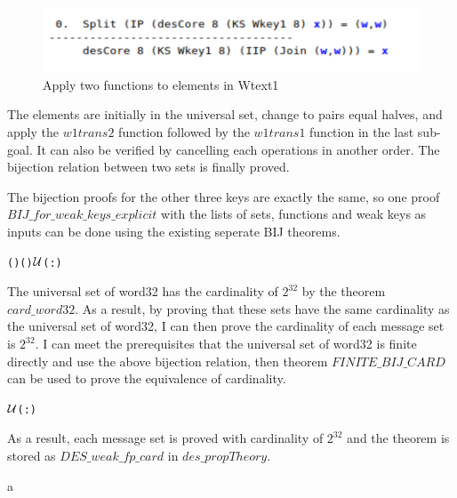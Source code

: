 \documentclass{article}
\begin{document}
\begin{figure}
\centering
\includegraphics[width=0.25\linewidth]{BIJ}
\caption{\label{fig:form5} Apply two functions to elements in Wtext1}
\end{figure}

The elements are initially in the universal set, change to pairs equal halves, and apply the $w1trans2$ function followed
by the $w1trans1$ function in the last sub-goal. It can also be verified by cancelling each operations in another order.
The bijection relation between two sets is finally proved.

The bijection proofs for the other three keys are exactly the same, so one proof $BIJ\_for\_weak\_keys\_explicit$ with the lists of sets, functions and
weak keys as inputs can be done using the existing seperate BIJ theorems.

\begin{alltt}
   \HOLTokenTurnstile{}  \HOLSymConst{\HOLTokenLt{}}  \HOLSymConst{\HOLTokenImp{}}  (  ) (  ) \ensuremath{{\cal{U}}}(:)
\end{alltt}

The universal set of word32 has the cardinality of $2^{32}$ by the theorem $card\_word32$. As a result, by proving that
these sets have the same cardinality as the universal set of word32, I can then prove the cardinality of each message set
is $2^{32}$. I can meet the prerequisites that the universal set of word32 is finite directly and use the above
bijection relation, then theorem $FINITE\_BIJ\_CARD$ can be used to prove the equivalence of cardinality.

\begin{alltt}
   \HOLTokenTurnstile{}  \ensuremath{{\cal{U}}}(:) \HOLSymConst{=}  \HOLSymConst{\HOLTokenExp{}} 
\end{alltt}

\begin{alltt}
   \HOLTokenTurnstile{}   \HOLSymConst{\HOLTokenConj{}}     \HOLSymConst{\HOLTokenImp{}}   \HOLSymConst{=}  
\end{alltt}

As a result, each message set is proved with cardinality of $2^{32}$ and the theorem is stored as
$DES\_weak\_fp\_card$ in $des\_propTheory$.

\begin{alltt}
   \HOLTokenTurnstile{}    \HOLSymConst{\HOLTokenImp{}}   \HOLSymConst{=}  \HOLSymConst{\HOLTokenExp{}} 
\end{alltt}

   a
\end{document}

